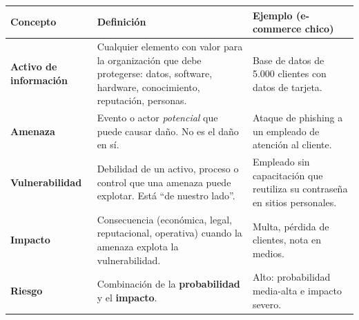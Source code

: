 \documentclass[12pt,a4paper]{article}
\begin{document}
\begin{tabularx}{\textwidth}{|>{\bfseries\color{azulPrincipal}}p{3cm}|X|X|}
\hline
\rowcolor{grisClaro}
Concepto & Definici\'on & Ejemplo (e-commerce chico) \\
\hline
Activo de informaci\'on & Cualquier elemento con valor para la organizaci\'on que debe protegerse: datos, software, hardware, conocimiento, reputaci\'on, personas. & Base de datos de 5.000 clientes con datos de tarjeta. \\
\hline
Amenaza & Evento o actor \emph{potencial} que puede causar da\~no. No es el da\~no en s\'i. & Ataque de phishing a un empleado de atenci\'on al cliente. \\
\hline
Vulnerabilidad & Debilidad de un activo, proceso o control que una amenaza puede explotar. Est\'a ``de nuestro lado''. & Empleado sin capacitaci\'on que reutiliza su contrase\~na en sitios personales. \\
\hline
Impacto & Consecuencia (econ\'omica, legal, reputacional, operativa) cuando la amenaza explota la vulnerabilidad. & Multa, p\'erdida de clientes, nota en medios. \\
\hline
Riesgo & Combinaci\'on de la \textbf{probabilidad} y el \textbf{impacto}. & Alto: probabilidad media-alta e impacto severo. \\
\hline
\end{tabularx}

\begin{center}
\end{center}

\begin{center}
\end{center}
\end{document}
